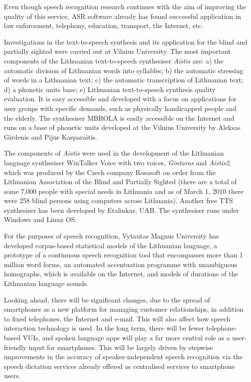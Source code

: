 \documentclass[]{../metanetpaper}
\begin{document}
\begin{multicols}{2}
    Even though speech recognition research continues with the aim of improving the quality of this service, ASR software already has found successful application in law enforcement, telephony, education, transport, the Internet, etc.

Investigations in the text-to-speech synthesis and its application for the blind and partially sighted were carried out at Vilnius University. The most important components of the Lithuanian text-to-speech synthesiser \textit{Aistis} are: a) the automatic division of Lithuanian words into syllables; b) the automatic stressing of words in a Lithuanian text; c) the automatic transcription of Lithuanian text; d) a phonetic units base; e) Lithuanian text-to-speech synthesis quality evaluation. It is easy accessible and developed with a focus on applications for user groups with specific demands, such as physically handicapped people and the elderly. The synthesiser MBROLA is easily accessible on the Internet and runs on a base of phonetic units developed at the Vilnius University by Aleksas Girdenis and Pijus Kasparaitis.

The components of \textit{Aistis} were used in the development of the Lithuanian language synthesiser WinTalker Voice with two voices,  \textit{Gintaras} and  \textit{Aistis2}, which was produced by the Czech company Rosasoft on order from the Lithuanian Association of the Blind and Partially Sighted (there are a total of some 7,000 people with special needs in Lithuania and as of March 1, 2010 there were 258 blind persons using computers across Lithuania). Another free TTS synthesiser has been developed by  Etalinkas, UAB. The synthesiser runs under Windows and Linux OS.

For the purposes of speech recognition, Vytautas Magnus University has developed corpus-based statistical models of the Lithuanian language, a prototype of a continuous speech recognition tool that encompasses more than 1 million word forms, an automated accentuation programme with unambiguous homographs, which is available on the Internet, and models of durations of the Lithuanian language sounds.

Looking ahead, there will be significant changes, due to the spread of smartphones as a new platform for managing customer relationships, in addition to fixed telephones, the Internet and e-mail. This will also affect how speech interaction technology is used. In the long term, there will be fewer telephone-based VUIs, and spoken language apps will play a far more central role as a user-friendly input for smartphones. This will be largely driven by stepwise improvements in the accuracy of speaker-independent speech recognition via the speech dictation services already offered as centralised services to smartphone users.


\end{multicols}
\end{document}
